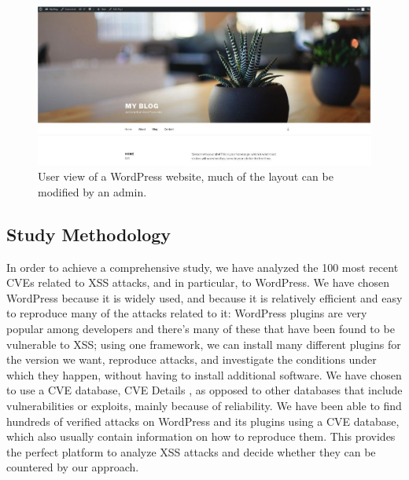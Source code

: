 \begin{figure}[h]
	\includegraphics[scale=0.3]{img/user_view.JPG}
	\caption{User view of a WordPress website, much of the layout can be modified by an admin.}
	\label{fig:user_view}
\end{figure}

\subsection{Study Methodology}
In order to achieve a comprehensive study, we have analyzed the 100 most recent CVEs related to XSS attacks, and in particular, to WordPress. We have chosen WordPress because it is widely used, and because it is relatively efficient and easy to reproduce many of the attacks related to it: WordPress plugins are very popular among developers and there's many of these that have been found to be vulnerable to XSS; using one framework, we can install many different plugins for the version we want, reproduce attacks, and investigate the conditions under which they happen, without having to install additional software. We have chosen to use a CVE database, CVE Details \cite{cvedetails}, as opposed to other databases that include vulnerabilities or exploits, mainly because of reliability. We have been able to find hundreds of verified attacks on WordPress and its plugins using a CVE database, which also usually contain information on how to reproduce them. This provides the perfect platform to analyze XSS attacks and decide whether they can be countered by our approach. 

